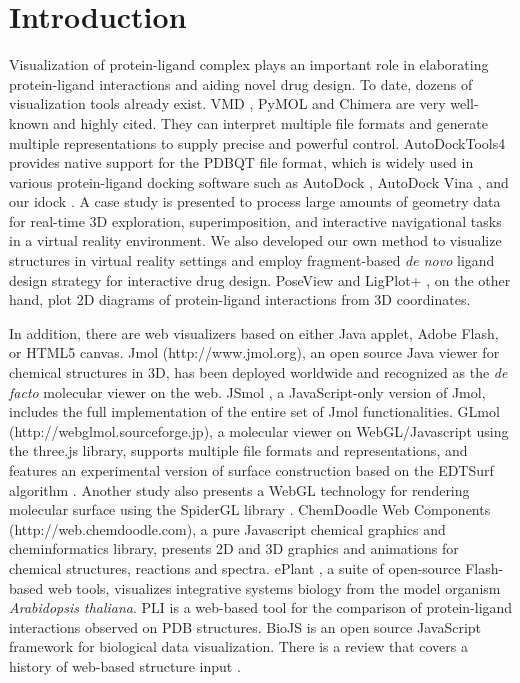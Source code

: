 \documentclass{bioinfo}
\begin{document}
\section{Introduction}

Visualization of protein-ligand complex plays an important role in elaborating protein-ligand interactions and aiding novel drug design. To date, dozens of visualization tools already exist. VMD \citep{1220}, PyMOL \citep{1221} and Chimera \citep{1219} are very well-known and highly cited. They can interpret multiple file formats and generate multiple representations to supply precise and powerful control. AutoDockTools4 \citep{596} provides native support for the PDBQT file format, which is widely used in various protein-ligand docking software such as AutoDock \citep{596}, AutoDock Vina \citep{595}, and our idock \citep{1153}. A case study \citep{1321} is presented to process large amounts of geometry data for real-time 3D exploration, superimposition, and interactive navigational tasks in a virtual reality environment. We also developed our own method \citep{1265} to visualize structures in virtual reality settings and employ fragment-based \textit{de novo} ligand design strategy for interactive drug design. PoseView \citep{748} and LigPlot+ \citep{951}, on the other hand, plot 2D diagrams of protein-ligand interactions from 3D coordinates.

In addition, there are web visualizers based on either Java applet, Adobe Flash, or HTML5 canvas. Jmol (http://www.jmol.org), an open source Java viewer for chemical structures in 3D, has been deployed worldwide and recognized as the \textit{de facto} molecular viewer on the web. JSmol \citep{1314}, a JavaScript-only version of Jmol, includes the full implementation of the entire set of Jmol functionalities. GLmol (http://webglmol.sourceforge.jp), a molecular viewer on WebGL/Javascript using the three.js library, supports multiple file formats and representations, and features an experimental version of surface construction based on the EDTSurf algorithm \citep{1297}. Another study \citep{1262} also presents a WebGL technology for rendering molecular surface using the SpiderGL library \citep{1320}. ChemDoodle Web Components (http://web.chemdoodle.com), a pure Javascript chemical graphics and cheminformatics library, presents 2D and 3D graphics and animations for chemical structures, reactions and spectra. ePlant \citep{1242}, a suite of open-source Flash-based web tools, visualizes integrative systems biology from the model organism \textit{Arabidopsis thaliana}. PLI \citep{1288} is a web-based tool for the comparison of protein-ligand interactions observed on PDB structures. BioJS \citep{1308} is an open source JavaScript framework for biological data visualization. There is a review that covers a history of web-based structure input \citep{1243}.
\end{document}

